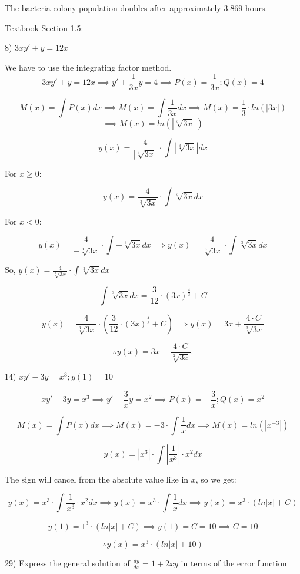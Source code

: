 \documentclass{article}
\begin{document}
The bacteria colony population doubles after approximately $3.869$ hours.


Textbook Section 1.5:

8) $3xy' + y = 12x$

We have to use the integrating factor method.
\[3xy' + y = 12x
\implies y' + \frac{1}{3x}y = 4
\implies P(x) = \frac{1}{3x}; Q(x) = 4\]

\[M(x) = \int P(x) dx
\implies M(x) = \int \frac{1}{3x} dx
\implies M(x) = \frac{1}{3} \cdot ln(|3x|)\]
\[\implies M(x) = ln(|\sqrt[3]{3x}|)\]

\[y(x) = \frac{4}{|\sqrt[3]{3x}|} \cdot \int |\sqrt[3]{3x}| dx\]

For $x \geq 0$:

\[y(x) = \frac{4}{\sqrt[3]{3x}} \cdot \int \sqrt[3]{3x} dx\]


For $x < 0$:

\[y(x) = \frac{4}{-\sqrt[3]{3x}} \cdot \int -\sqrt[3]{3x} dx
\implies y(x) = \frac{4}{\sqrt[3]{3x}} \cdot \int \sqrt[3]{3x} dx\]



So, $y(x) = \frac{4}{\sqrt[3]{3x}} \cdot \int \sqrt[3]{3x} dx$



\[\int \sqrt[3]{3x} dx = \frac{3}{12} \cdot (3x)^{\frac{4}{3}} + C\]

\[y(x) = \frac{4}{\sqrt[3]{3x}} \cdot (\frac{3}{12} \cdot (3x)^{\frac{4}{3}} + C)
\implies y(x) = 3x + \frac{4 \cdot C}{\sqrt[3]{3x}}\]

\[\therefore y(x) = 3x + \frac{4 \cdot C}{\sqrt[3]{3x}}.\]


14) $xy' - 3y = x^3; y(1) = 10$

\[xy' - 3y = x^3
\implies y' - \frac{3}{x}y = x^2
\implies P(x) = -\frac{3}{x}; Q(x) = x^2\]

\[M(x) = \int P(x) dx
\implies M(x) = -3 \cdot \int \frac{1}{x} dx
\implies M(x) = ln(|x^{-3}|)\]

\[y(x) = |x^3| \cdot \int |\frac{1}{x^3}| \cdot x^2 dx\]

The sign will cancel from the absolute value like in $x$, so we get:

\[y(x) = x^3 \cdot \int \frac{1}{x^3} \cdot x^2 dx
\implies y(x) = x^3 \cdot \int \frac{1}{x} dx
\implies y(x) = x^3 \cdot (ln|x| + C)\]

\[y(1) = 1^3 \cdot (ln|x| + C)
\implies y(1) = C = 10
\implies C = 10\]

\[\therefore y(x) = x^3 \cdot (ln|x| + 10)\]


29) Express the general solution of $\frac{dy}{dx} = 1 + 2xy$ in
terms of the error function
\end{document}
